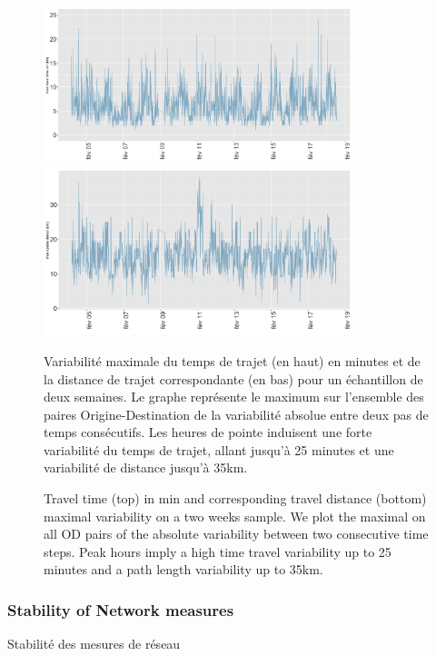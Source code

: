 \begin{figure}[t]\vspace*{4pt}
\centering
\centerline{\includegraphics[width=0.8\textwidth]{Figures/TransportationEquilibrium/gr31}}
\centerline{\includegraphics[width=0.8\textwidth]{Figures/TransportationEquilibrium/gr32}}
\caption{Travel time (top) in min and corresponding travel distance (bottom) maximal variability on a two weeks sample. We plot the maximal on all OD pairs of the absolute variability between two consecutive time steps. Peak hours imply a high time travel variability up to 25 minutes and a path length variability up to 35km.}{Variabilité maximale du temps de trajet (en haut) en minutes et de la distance de trajet correspondante (en bas) pour un échantillon de deux semaines. Le graphe représente le maximum sur l'ensemble des paires Origine-Destination de la variabilité absolue entre deux pas de temps consécutifs. Les heures de pointe induisent une forte variabilité du temps de trajet, allant jusqu'à 25 minutes et une variabilité de distance jusqu'à 35km.}
\label{fig:fig-3}
\end{figure}




\subsubsection{Stability of Network measures}{Stabilité des mesures de réseau}

